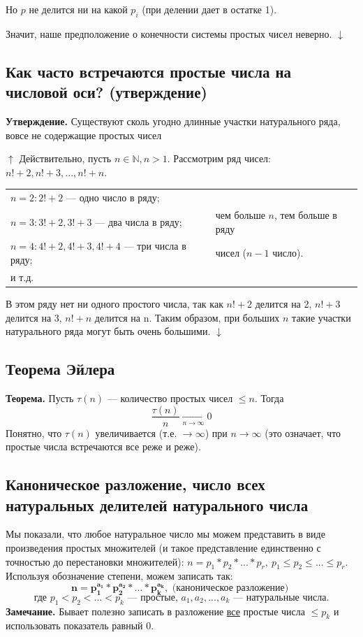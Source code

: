 \documentclass{article}
\begin{document}
            Но \( p \) не делится ни на какой \( p_i \) (при делении дает в остатке 1).

            Значит, наше предположение о конечности системы простых чисел неверно. \( \downarrow \)
            
        \subsection{Как часто встречаются простые числа на числовой оси? (утверждение)} 
        	\textbf{Утверждение.} Существуют сколь угодно длинные участки натурального ряда, вовсе не содержащие простых чисел

            \( \uparrow \) Действительно, пусть \( n \in \mathbb{N}, n > 1 \). Рассмотрим ряд чисел: \( n! + 2,n! + 3,...,n! + n \).

            \begin{tabular}{ll}
              \( n = 2: 2! + 2 \) --- одно число в ряду; &\\
              \( n = 3: 3! + 2, 3! + 3 \) --- два числа в ряду; & чем больше \( n \), тем больше в ряду\\
              \( n = 4: 4! + 2, 4! + 3, 4! + 4 \) --- три числа в ряду; & чисел (\( n - 1 \) число).\\
              и т.д. &\\
            \end{tabular}

            В этом ряду нет ни одного простого числа, так как \( n! + 2 \) делится на 2, \( n! + 3 \) делится на 3, \( n! + n \) делится на n. Таким образом, при больших \( n \) такие участки натурального ряда могут быть очень большими. \( \downarrow \) 
            
        \subsection{Теорема Эйлера}
            \textbf{Теорема.} Пусть \( \tau(n) \) --- количество простых чисел \( \leq n \). Тогда \[ \frac{\tau(n)}{n} \xrightarrow[n \rightarrow \infty]{} 0 \]
            Понятно, что \( \tau(n) \) увеличивается (т.е. \( \rightarrow \infty \)) при \( n \rightarrow \infty \) (это означает, что простые числа встречаются все реже и реже).

        \subsection{Каноническое разложение, число всех натуральных делителей натурального числа}
            Мы показали, что любое натуральное число мы можем представить в виде произведения простых множителей (и такое представление единственно с точностью до перестановки множителей): \( n = p_1*p_2*...*p_r,\ p_1 \leq p_2 \leq ... \leq p_r \). Используя обозначение степени, можем записать так:
            \[ \mathbf{n = p_1^{a_1}*p_2^{a_2}*...*p_k^{a_k}}, \textrm{ (каноническое разложение) } \] 
            \[ \textrm{где } p_1 < p_2 < ... < p_k \textrm{ --- простые, } a_1, a_2, ..., a_k \textrm{ --- натуральные числа.} \]
            \textbf{Замечание.} Бывает полезно записать в разложение \underline{все} простые числа \( \leq p_k \) и использовать показатель равный 0.
\end{document}
